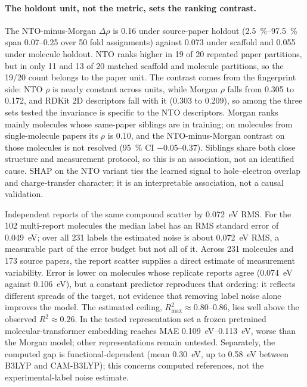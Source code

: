 \paragraph{The holdout unit, not the metric, sets the ranking contrast.}
The NTO-minus-Morgan $\Delta\rho$ is \num{0.16}
under source-paper holdout (\qtyrange{2.5}{97.5}{\percent} span \numrange{0.07}{0.25} over \num{50} fold
assignments) against \num{0.073} under scaffold and \num{0.055} under molecule
holdout. NTO ranks higher in \num{19} of \num{20} repeated paper partitions, but in
only \num{11} and \num{13} of \num{20} matched scaffold and molecule partitions, so
the \num{19}/\num{20} count belongs to the paper unit. The contrast comes from the
fingerprint side: NTO $\rho$ is nearly constant across units, while Morgan $\rho$
falls from \num{0.305} to \num{0.172}, and RDKit 2D descriptors fall with it
(\num{0.303} to \num{0.209}), so among the three sets tested the invariance is
specific to the NTO descriptors. Morgan ranks mainly molecules whose same-paper
siblings are in training; on molecules from single-molecule papers its $\rho$ is
\num{0.10}, and the NTO-minus-Morgan contrast on those molecules is not resolved
(\qty{95}{\percent} CI \numrange{-0.05}{0.37}). Siblings share both close structure
and measurement protocol, so this is an association, not an identified cause. SHAP
on the NTO variant ties the learned signal to hole--electron overlap and
charge-transfer character; it is an interpretable association, not a causal
validation.

Independent reports of the same compound
scatter by \qty{0.072}{\electronvolt} RMS. For the \num{102} multi-report molecules
the median label has an RMS standard error of \qty{0.049}{\electronvolt}; over all
\num{231} labels the estimated noise is about \qty{0.072}{\electronvolt} RMS, a
measurable part of the error budget but not all of it. Across \num{231}
molecules and \num{173} source papers, the report scatter supplies a direct
estimate of measurement variability. Error is lower on molecules whose
replicate reports agree (\qty{0.074}{\electronvolt} against
\qty{0.106}{\electronvolt}), but a constant predictor reproduces that ordering:
it reflects different spreads of the target, not evidence that removing label
noise alone improves the model. The estimated ceiling,
$R^2_\text{max} \approx 0.80$--\num{0.86}, lies well above the observed
$R^2 \approx 0.26$. In the tested representation set a frozen
pretrained molecular-transformer embedding reaches MAE
\qtyrange{0.109}{0.113}{\electronvolt}, worse than the Morgan model; other
representations remain untested. Separately, the computed gap is functional-dependent (mean
\qty{0.30}{\electronvolt}, up to \qty{0.58}{\electronvolt} between B3LYP and
CAM-B3LYP); this concerns computed references, not the experimental-label
noise estimate.

